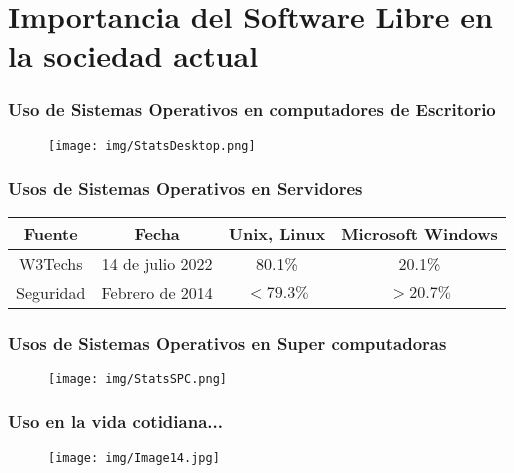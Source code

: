 \documentclass{beamer}
\begin{document}
\AtBeginSection[]
{
  \begin{frame}
    \tableofcontents[sectionstyle=show/shaded,subsectionstyle=show/shaded/hide,subsubsectionstyle=show/shaded/hide]
  \end{frame}
}
\section{Importancia del Software Libre en la sociedad actual}
\begin{frame}
  \centering
  \frametitle{Uso de Sistemas Operativos en computadores de Escritorio}
  \begin{figure}[H]
    \centering
    \texttt{[image: img/StatsDesktop.png]}
  \end{figure}
\end{frame}

\begin{frame}
  \centering
  \frametitle{Usos de Sistemas Operativos en Servidores}
  \begin{table}
    \begin{tabular}{|c|c|c|c|}
      \hline
      \textbf{Fuente} & \textbf{Fecha} & \textbf{Unix, Linux} & \textbf{Microsoft Windows} \\ \hline
      W3Techs & 14 de julio 2022 & 80.1\% & 20.1\% \\ \hline
      Seguridad & Febrero de 2014 & \(<79.3\%\) & \(>20.7\%\) \\ \hline
    \end{tabular}
  \end{table}
\end{frame}

\begin{frame}
  \centering
  \frametitle{Usos de Sistemas Operativos en Super computadoras}
  \begin{figure}[H]
    \centering
    \texttt{[image: img/StatsSPC.png]}
  \end{figure}
\end{frame}

\begin{frame}
  \centering
  \frametitle{Uso en la vida cotidiana...}
  \begin{figure}[H]
    \centering
    \texttt{[image: img/Image14.jpg]}
  \end{figure}
\end{frame}


\AtBeginSection[]
{
  \begin{frame}
    \tableofcontents[sectionstyle=show/shaded,subsectionstyle=show/shaded/hide,subsubsectionstyle=show/shaded/hide]
  \end{frame}
}
\end{document}

